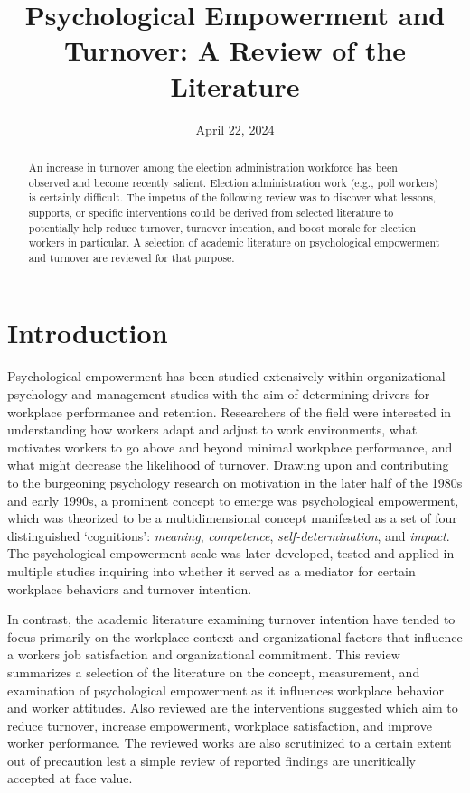 \documentclass[
  11pt,
  a4paper,
]{article}
\title{Psychological Empowerment and Turnover: A Review of the
Literature}
\date{April 22, 2024}
\author{\sf{\Large\textbf{Isaiah Espinoza} \\\large Research
Assistant\\[0.5cm]}}
\makeatletter
\def\maketitle{\front{\expandafter{\@title}}{\@author}{\@organization}}
\makeatother
\begin{document}
\maketitle
\begin{abstract}
An increase in turnover among the election administration workforce has
been observed and become recently salient. Election administration work
(e.g., poll workers) is certainly difficult. The impetus of the
following review was to discover what lessons, supports, or specific
interventions could be derived from selected literature to potentially
help reduce turnover, turnover intention, and boost morale for election
workers in particular. A selection of academic literature on
psychological empowerment and turnover are reviewed for that purpose.
\end{abstract}

\section{Introduction}\label{introduction}

Psychological empowerment has been studied extensively within
organizational psychology and management studies with the aim of
determining drivers for workplace performance and retention. Researchers
of the field were interested in understanding how workers adapt and
adjust to work environments, what motivates workers to go above and
beyond minimal workplace performance, and what might decrease the
likelihood of turnover. Drawing upon and contributing to the burgeoning
psychology research on motivation in the later half of the 1980s and
early 1990s, a prominent concept to emerge was psychological
empowerment, which was theorized to be a multidimensional concept
manifested as a set of four distinguished `cognitions': \emph{meaning},
\emph{competence}, \emph{self-determination}, and \emph{impact}. The
psychological empowerment scale was later developed, tested and applied
in multiple studies inquiring into whether it served as a mediator for
certain workplace behaviors and turnover intention.

In contrast, the academic literature examining turnover intention have
tended to focus primarily on the workplace context and organizational
factors that influence a workers job satisfaction and organizational
commitment. This review summarizes a selection of the literature on the
concept, measurement, and examination of psychological empowerment as it
influences workplace behavior and worker attitudes. Also reviewed are
the interventions suggested which aim to reduce turnover, increase
empowerment, workplace satisfaction, and improve worker performance. The
reviewed works are also scrutinized to a certain extent out of
precaution lest a simple review of reported findings are uncritically
accepted at face value.
\end{document}
